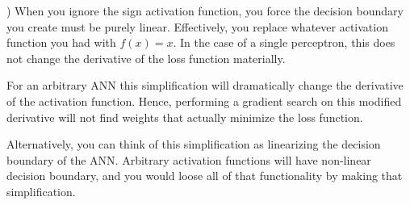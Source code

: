 \documentclass[12pt]{article}
\begin{document}
) When you ignore the sign activation function, you force the decision boundary
you create must be purely linear. Effectively, you replace whatever activation 
function you had with $f(x)=x$. In the case of a single perceptron, this 
does not change the derivative of the loss function materially. 

For an arbitrary ANN this simplification will 
dramatically change the derivative of the activation function. Hence, performing 
a gradient search on this modified derivative will not find weights that actually 
minimize the loss function. 

Alternatively, you can think of this simplification as linearizing the 
decision boundary of the ANN. Arbitrary activation functions will have non-linear
decision boundary, and you would loose all of that functionality by making 
that simplification. 

   
\end{document}

